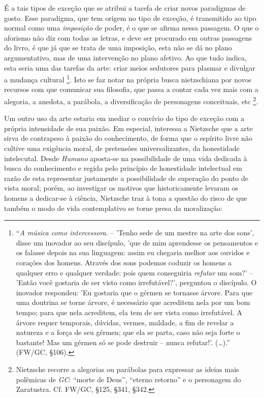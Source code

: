 \documentclass[
	12pt,				%
	openright,			%
	oneside,			%
	a4paper,			%
	english,			%
	french,				%
	spanish,			%
	brazil				%
	]{abntex2}
\begin{document}
	É a tais tipos de exceção que se atribui a tarefa de criar novos paradigmas de gosto. Esse paradigma, que tem origem no tipo de exceção, é transmitido ao tipo normal como uma \textit{imposição} de poder, é o que se afirma nessa passagem. O que o aforismo não diz com todas as letras, e deve ser procurado em outras passagens do livro, é que já que se trata de uma imposição, esta não se dá no plano argumentativo, mas de uma intervenção no plano afetivo. Ao que tudo indica, esta seria uma das tarefas da arte: criar meios sedutores para plasmar e divulgar a mudança cultural
\footnote{“\textit{A música como intercessora}. – 'Tenho sede de um mestre na arte dos sons', disse um inovador ao seu discípulo, 'que de mim aprendesse os pensamentos e os falasse depois na sua linguagem: assim eu chegaria melhor aos ouvidos e corações dos homens. Através dos sons podemos coduzir os homens a qualquer erro e qualquer verdade: pois quem conseguiria \textit{refutar} um som?' – 'Então você gostaria de ser visto como irrefutável?', perguntou o discípulo. O inovador respondeu: 'Eu gostaria que o gérmen se tornasse árvore. Para que uma doutrina se torne árvore, é necessário que acreditem nela por um bom tempo; para que nela acreditem, ela tem de ser vista como irrefutável. A árvore requer temporais, dúvidas, vermes, maldade, a fim de revelar a natureza e a força de seu gérmen; que ela se parta, caso não seja forte o bastante! Mas um gérmen só se pode destruir – nunca refutar!'. (…).” (FW/GC, §106).}. 
Isto se faz notar na própria busca nietzschiana por novos recursos com que comunicar sua filosofia, que passa a contar cada vez mais com a alegoria, a anedota, a parábola, a diversificação de personagens conceituais, etc
\footnote{Nietzsche recorre a alegorias ou parábolas para expressar as ideias mais polêmicas de \textit{GC}: “morte de Deus”, “eterno retorno” e o personagem do Zaratustra. Cf. FW/GC, §125, §341, §342.}.
	
	Um outro uso da arte estaria em mediar o convívio do tipo de exceção com a própria intensidade de sua paixão. Em especial, interessa a Nietzsche que a arte sirva de contrapeso à paixão do conhecimento, de forma que o espírito livre não cultive uma exigência moral, de pretensões universalizantes, da honestidade intelecutal. Desde \textit{Humano} aposta-se na possibilidade de uma vida dedicada à busca do conhecimento e regida pelo princípio de honestidade intelectual em razão de esta representar justamente a possibilidade de superação do ponto de vista moral; porém, ao investigar os motivos que historicamente levaram os homens a dedicar-se à ciência, Nietzsche traz à tona a questão do risco de que também o modo de vida contemplativo se torne presa da moralização:
\end{document}
